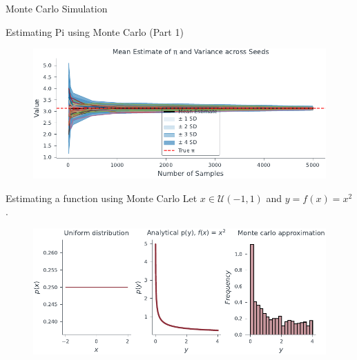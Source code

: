 \documentclass{beamer}
\begin{document}
\begin{section}{Monte Carlo Simulation}
\begin{frame}[fragile]{Estimating Pi using Monte Carlo (Part 1)}
        \begin{center}
        \end{center}
    \end{frame}

    \begin{frame}
        \begin{figure}
                \centering
                \includegraphics[scale = 0.8]{../figures/prediction_var_mc_pi.pdf}
            \end{figure}
    \end{frame}

    \begin{frame}{Estimating a function using Monte Carlo}
        Let $x\in \mathcal{U}(-1,1)$ and $y = f(x) = x^2$.
        \begin{figure}
            \centering
        \includegraphics[scale=0.75]{../figures/mc_sampling_ex.pdf}
            \end{figure}    
    \end{frame}


\end{section}
\end{document}
